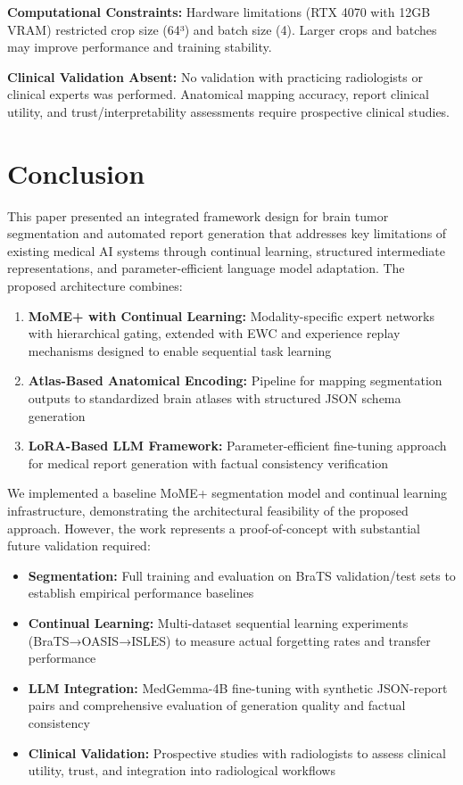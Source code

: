 \documentclass[conference]{IEEEtran}
\begin{document}
\textbf{Computational Constraints:} Hardware limitations (RTX 4070 with 12GB VRAM) restricted crop size (64³) and batch size (4). Larger crops and batches may improve performance and training stability.

\textbf{Clinical Validation Absent:} No validation with practicing radiologists or clinical experts was performed. Anatomical mapping accuracy, report clinical utility, and trust/interpretability assessments require prospective clinical studies.

\section{Conclusion}

This paper presented an integrated framework design for brain tumor segmentation and automated report generation that addresses key limitations of existing medical AI systems through continual learning, structured intermediate representations, and parameter-efficient language model adaptation. The proposed architecture combines:

\begin{enumerate}
\item \textbf{MoME+ with Continual Learning:} Modality-specific expert networks with hierarchical gating, extended with EWC and experience replay mechanisms designed to enable sequential task learning
\item \textbf{Atlas-Based Anatomical Encoding:} Pipeline for mapping segmentation outputs to standardized brain atlases with structured JSON schema generation
\item \textbf{LoRA-Based LLM Framework:} Parameter-efficient fine-tuning approach for medical report generation with factual consistency verification
\end{enumerate}

We implemented a baseline MoME+ segmentation model and continual learning infrastructure, demonstrating the architectural feasibility of the proposed approach. However, the work represents a proof-of-concept with substantial future validation required:

\begin{itemize}
\item \textbf{Segmentation:} Full training and evaluation on BraTS validation/test sets to establish empirical performance baselines
\item \textbf{Continual Learning:} Multi-dataset sequential learning experiments (BraTS→OASIS→ISLES) to measure actual forgetting rates and transfer performance
\item \textbf{LLM Integration:} MedGemma-4B fine-tuning with synthetic JSON-report pairs and comprehensive evaluation of generation quality and factual consistency
\item \textbf{Clinical Validation:} Prospective studies with radiologists to assess clinical utility, trust, and integration into radiological workflows
\end{itemize}
\end{document}
